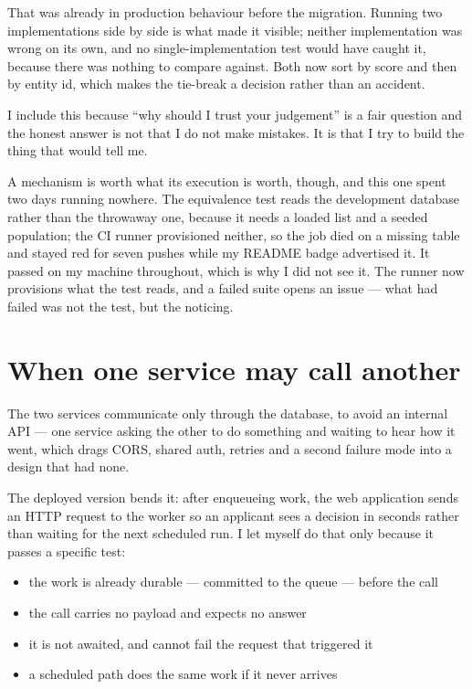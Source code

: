 \documentclass[11pt,a4paper]{article}
\begin{document}
That was already in production behaviour before the migration. Running two
implementations side by side is what made it visible; neither implementation was
wrong on its own, and no single-implementation test would have caught it,
because there was nothing to compare against. Both now sort by score and then by
entity id, which makes the tie-break a decision rather than an accident.

I include this because ``why should I trust your judgement'' is a fair question
and the honest answer is not that I do not make mistakes. It is that I try to
build the thing that would tell me.

A mechanism is worth what its execution is worth, though, and this one spent two
days running nowhere. The equivalence test reads the development database rather
than the throwaway one, because it needs a loaded list and a seeded population;
the CI runner provisioned neither, so the job died on a missing table and stayed
red for seven pushes while my README badge advertised it. It passed on my
machine throughout, which is why I did not see it. The runner now provisions
what the test reads, and a failed suite opens an issue --- what had failed was
not the test, but the noticing.

\section{When one service may call another}

The two services communicate only through the database, to avoid an internal
API --- one service asking the other to do something and waiting to hear how it
went, which drags CORS, shared auth, retries and a second failure mode into a
design that had none.

The deployed version bends it: after enqueueing work, the web application sends
an HTTP request to the worker so an applicant sees a decision in seconds rather
than waiting for the next scheduled run. I let myself do that only because it
passes a specific test:

\begin{itemize}\itemsep0em
\item the work is already durable --- committed to the queue --- before the call
\item the call carries no payload and expects no answer
\item it is not awaited, and cannot fail the request that triggered it
\item a scheduled path does the same work if it never arrives
\end{itemize}
\end{document}
